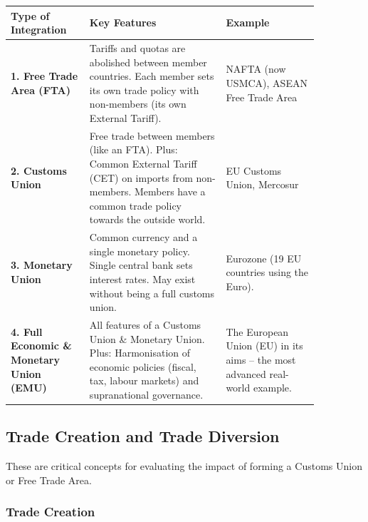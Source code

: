 \documentclass[11pt, a4paper, twoside]{book}
\begin{document}
\begin{example}
\begin{tabular}{@{}>{\RaggedRight\arraybackslash}p{0.22\linewidth}>{\RaggedRight\arraybackslash}p{0.38\linewidth}>{\RaggedRight\arraybackslash}p{0.26\linewidth}@{}}
\textbf{Type of Integration} & \textbf{Key Features} & \textbf{Example} \\
\midrule
\textbf{1. Free Trade Area (FTA)} & Tariffs and quotas are abolished between member countries. Each member sets its own trade policy with non-members (its own External Tariff). & NAFTA (now USMCA), ASEAN Free Trade Area \\
\textbf{2. Customs Union} & Free trade between members (like an FTA). Plus: Common External Tariff (CET) on imports from non-members. Members have a common trade policy towards the outside world. & EU Customs Union, Mercosur \\
\textbf{3. Monetary Union} & Common currency and a single monetary policy. Single central bank sets interest rates. May exist without being a full customs union. & Eurozone (19 EU countries using the Euro). \\
\textbf{4. Full Economic \& Monetary Union (EMU)} & All features of a Customs Union \& Monetary Union. Plus: Harmonisation of economic policies (fiscal, tax, labour markets) and supranational governance. & The European Union (EU) in its aims -- the most advanced real-world example. \\
\end{tabular}
\end{example}

\subsection{Trade Creation and Trade Diversion}

These are critical concepts for evaluating the impact of forming a Customs Union or Free Trade Area.

\subsubsection{Trade Creation}
\end{document}
